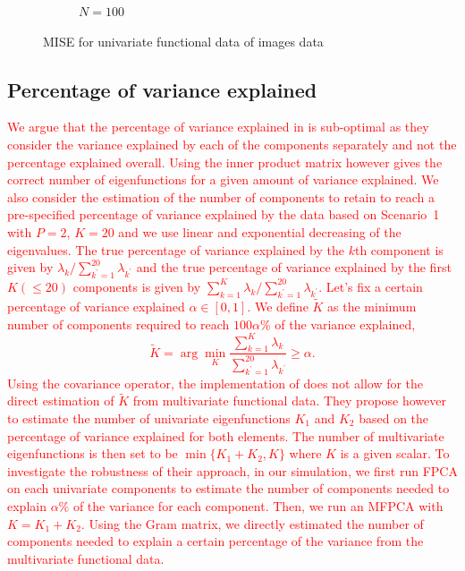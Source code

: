 \begin{results}
\begin{figure}
\begin{subfigure}[b]{0.49\textwidth}
         \caption{$N = 100$}
         \label{fig:mise_mfd_2d_100}
    \end{subfigure}
    \caption{MISE for univariate functional data of images data}
    \label{fig:mise_mfd_2d}
\end{figure}

\end{results}



\subsection{Percentage of variance explained} %
\label{sub:percentage_of_variance_explained_simulation}

\textcolor{red}{We argue that the percentage of variance explained in \cite{happMultivariateFunctionalPrincipal2018a} is sub-optimal as they consider the variance explained by each of the components separately and not the percentage explained overall. Using the inner product matrix however gives the correct number of eigenfunctions for a given amount of variance explained.
We also consider the estimation of the number of components to retain to reach a pre-specified percentage of variance explained by the data based on Scenario~1 with $P = 2$, $K = 20$ and we use linear and exponential decreasing of the eigenvalues. The true percentage of variance explained by the $k$th component is given by $\lambda_k / \sum_{k^\prime = 1}^{20} \lambda_{k^\prime}$ and the true percentage of variance explained by the first $K (\leq 20)$ components is given by $\sum_{k = 1}^K \lambda_k / \sum_{k^\prime = 1}^{20} \lambda_{k^\prime}$.
Let's fix a certain percentage of variance explained $\alpha \in [0, 1]$. We define $\widetilde{K}$ as the minimum number of components required to reach $100\alpha\%$ of the variance explained,
\begin{equation}
    \widetilde{K} = \arg\min_K \frac{\sum_{k = 1}^K \lambda_k}{\sum_{k^\prime = 1}^{20} \lambda_{k^\prime}} \geq \alpha.
\end{equation}
Using the covariance operator, the implementation of \cite{happMultivariateFunctionalPrincipal2018a} does not allow for the direct estimation of $\widetilde{K}$ from multivariate functional data. They propose however to estimate the number of univariate eigenfunctions $K_1$ and $K_2$ based on the percentage of variance explained for both elements. The number of multivariate eigenfunctions is then set to be $\min\{K_1 + K_2, K\}$ where $K$ is a given scalar. To investigate the robustness of their approach, in our simulation, we first run FPCA on each univariate components to estimate the number of components needed to explain $\alpha\%$ of the variance for each component. Then, we run an MFPCA with $K = K_1 + K_2$. Using the Gram matrix, we directly estimated the number of components needed to explain a certain percentage of the variance from the multivariate functional data.
}
